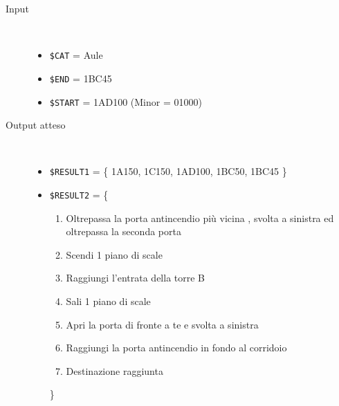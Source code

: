 \documentclass[../../SperimentazioniPratiche.tex]{subfiles}
\begin{document}
			\begin{tcolorbox}[fonttitle=\bfseries, 
								adjusted title={\Large Prova 1C.2}, 
								breakable, 
								sharp corners=south,
								colback=white, 
								colframe=white!60!black]
								
				\begin{description}%
				
					\item[Input] \ \par 
        				\begin{itemize}
        					\item \verb|$CAT| = Aule
							\item \verb|$END| = 1BC45
							\item \verb|$START| = 1AD100 (Minor = 01000)
        				\end{itemize}
        				
        			\tcbline 
        				
        			\item[Output atteso] \ \par
        				\begin{itemize}
        				
        					\item \verb|$RESULT1| = \{
        						1A150, 1C150, 1AD100, 1BC50, 1BC45
        					\}
        				
        					\item \verb|$RESULT2| = \{
        					\begin{enumerate}
        						\item Oltrepassa la porta antincendio più vicina , svolta a sinistra ed oltrepassa la seconda porta
        						\item Scendi 1 piano di scale
        						\item Raggiungi l'entrata della torre B
        						\item Sali 1 piano di scale
        						\item Apri la porta di fronte a te e svolta a sinistra
        						\item Raggiungi la porta antincendio in fondo al corridoio
        						\item Destinazione raggiunta
        					\end{enumerate}
        					\}
        					
        				\end{itemize}

					\tcbline				
        				

\end{description}
\end{tcolorbox}
\end{document}
